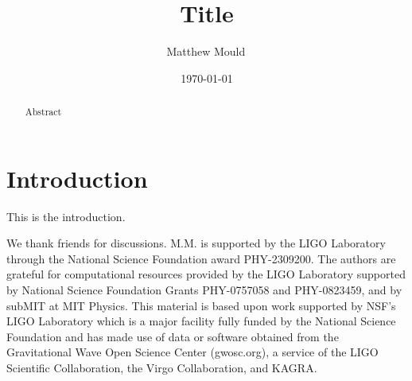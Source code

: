 \documentclass[twocolumn,linenumbers]{aastex631}
\begin{document}
\title{Title}

\author[0000-0001-5460-2910]{Matthew Mould\,}

\date{\today}

\begin{abstract}
Abstract
\end{abstract}


\section{Introduction}
\label{section: Introduction}

This is the introduction.


\begin{acknowledgments}
We thank friends for discussions.
%
M.M. is supported by the LIGO Laboratory through the National Science Foundation award PHY-2309200.
%
The authors are grateful for computational resources provided by
the LIGO Laboratory supported by National Science Foundation Grants PHY-0757058 and PHY-0823459,
and by subMIT at MIT Physics.
%
This material is based upon work supported by NSF's LIGO Laboratory which is a major facility fully funded by the National Science Foundation and has made use of data or software obtained from the Gravitational Wave Open Science Center (gwosc.org), a service of the LIGO Scientific Collaboration, the Virgo Collaboration, and KAGRA.
\end{acknowledgments}


{}

\end{document}
